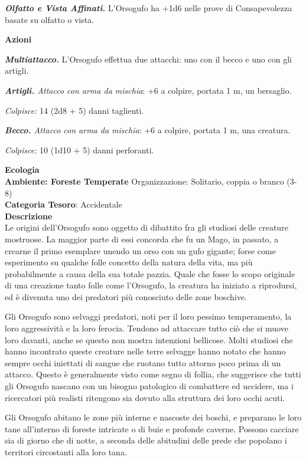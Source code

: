 \begin{multicols}{2}
{\emph{\textbf{Olfatto e Vista Affinati.}} L'Orsogufo ha +1d6 nelle prove di Consapevolezza basate su olfatto o vista.

\textbf{Azioni}

\emph{\textbf{Multiattacco.}} L'Orsogufo effettua due attacchi: uno con il becco e uno con gli artigli.

\emph{\textbf{Artigli.} Attacco con arma da mischia}: +6 a colpire, portata 1 m, un bersaglio.

\emph{Colpisce:} 14 (2d8 + 5) danni taglienti.

\emph{\textbf{Becco.} Attacco con arma da mischia}: +6 a colpire, portata 1 m, una creatura.

\emph{Colpisce:} 10 (1d10 + 5) danni perforanti.

\textbf{Ecologia}\\
\textbf{Ambiente: Foreste Temperate}
Organizzazione: Solitario, coppia o branco (3-8)\\
\textbf{Categoria Tesoro}: Accidentale\\
\textbf{Descrizione}\\
Le origini dell'Orsogufo sono oggetto di dibattito fra gli studiosi delle creature mostruose. La maggior parte di essi concorda che fu un Mago, in passato, a crearne il primo esemplare unendo un orso con un gufo gigante; forse come esperimento su qualche folle concetto della natura della vita, ma più probabilmente a causa della sua totale pazzia. Quale che fosse lo scopo originale di una creazione tanto folle come l'Orsogufo, la creatura ha iniziato a riprodursi, ed è divenuta uno dei predatori più conosciuto delle zone boschive.

Gli Orsogufo sono selvaggi predatori, noti per il loro pessimo temperamento, la loro aggressività e la loro ferocia. Tendono ad attaccare tutto ciò che si muove loro davanti, anche se questo non mostra intenzioni bellicose. Molti studiosi che hanno incontrato queste creature nelle terre selvagge hanno notato che hanno sempre occhi iniettati di sangue che ruotano tutto attorno poco prima di un attacco. Questo è generalmente visto come segno di follia, che suggerisce che tutti gli Orsogufo nascano con un bisogno patologico di combattere ed uccidere, ma i ricercatori più realisti ritengono sia dovuto alla struttura dei loro occhi acuti.

Gli Orsogufo abitano le zone più interne e nascoste dei boschi, e preparano le loro tane all'interno di foreste intricate o di buie e profonde caverne. Possono cacciare sia di giorno che di notte, a seconda delle abitudini delle prede che popolano i territori circostanti alla loro tana.

}
\end{multicols}
